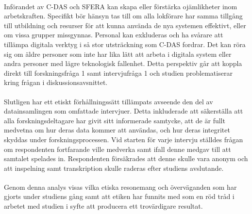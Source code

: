 \paragraph{}
\hspace{-15pt}
Införandet av C-DAS och SFERA kan skapa eller förstärka ojämlikheter inom arbetskraften.
Specifikt bör hänsyn tas till om alla lokförare har samma tillgång till utbildning och resurser för att kunna använda de nya systemen effektivt, eller om vissa grupper missgynnas.
Personal kan exkluderas och ha svårare att tillämpa digitala verktyg i så stor utsträckning som C-DAS fordrar.
Det kan röra sig om äldre personer som inte har lika lätt att arbeta i digitala system eller andra personer med lägre teknologisk fallenhet.
Detta perspektiv går att koppla direkt till forskningsfråga 1 samt intervjufråga 1 och studien problematiserar kring frågan i diskussionsavsnittet.
\paragraph{}
\hspace{-15pt}
Slutligen har ett etiskt förhållningssätt tillämpats avseende den del av datainsamlingen som omfattade intervjuer.
Detta inkluderade att säkerställa att alla forskningsdeltagare har givit sitt informerade samtycke, att de är fullt medvetna om hur deras data kommer att användas, och hur deras integritet skyddas under forskningsprocessen.
Vid starten för varje intervju ställdes frågan om respondenten fortfarande ville medverka samt ifall denne medgav till att samtalet spelades in.
Respondenten försäkrades att denne skulle vara anonym och att inspelning samt transkription skulle raderas efter studiens avslutande.
\paragraph{}
\hspace{-15pt}
Genom denna analys visas vilka etiska resonemang och överväganden som har gjorts under studiens gång samt att etiken har funnits med som en röd tråd i arbetet med studien i syfte att producera ett trovärdigare resultat.
